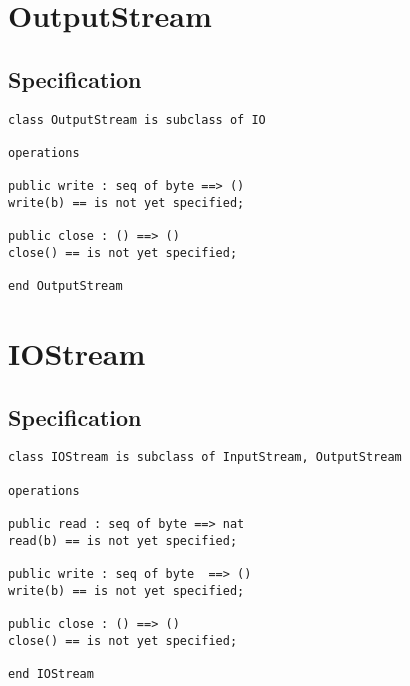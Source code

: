 \section{OutputStream}

\subsection{Specification}

\lstset{style=mystyle}
\bigskip
\begin{lstlisting}
class OutputStream is subclass of IO

operations

public write : seq of byte ==> ()
write(b) == is not yet specified;

public close : () ==> ()
close() == is not yet specified;

end OutputStream
\end{lstlisting}
\bigskip


\section{IOStream}

\subsection{Specification}

\lstset{style=mystyle}
\bigskip
\begin{lstlisting}
class IOStream is subclass of InputStream, OutputStream

operations

public read : seq of byte ==> nat
read(b) == is not yet specified;

public write : seq of byte  ==> ()
write(b) == is not yet specified;

public close : () ==> ()
close() == is not yet specified;

end IOStream
\end{lstlisting}
\bigskip

